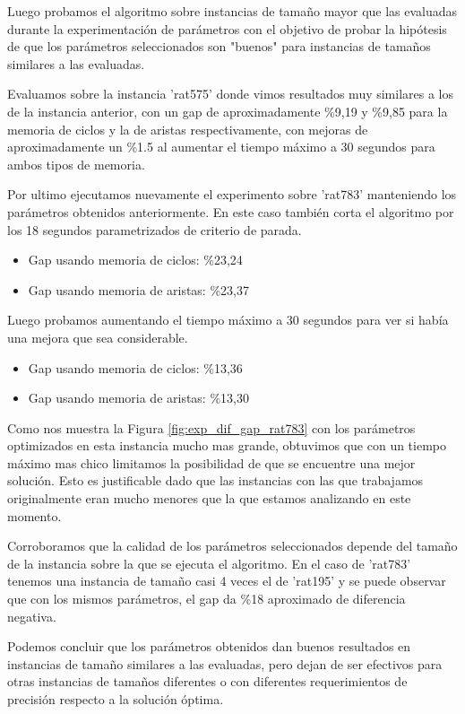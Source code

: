 \documentclass[10pt,a4paper]{article}
\begin{document}
Luego probamos el algoritmo sobre instancias de tamaño mayor que las evaluadas durante la experimentación de parámetros con el objetivo de probar la hipótesis de que los parámetros seleccionados son "buenos" para instancias de tamaños similares a las evaluadas.

Evaluamos sobre la instancia 'rat575' donde vimos resultados muy similares a los de la instancia anterior, con un gap de aproximadamente \%9,19 y \%9,85 para la memoria de ciclos y la de aristas respectivamente, con mejoras de aproximadamente un \%1.5 al aumentar el tiempo máximo a 30 segundos para ambos tipos de memoria.

Por ultimo ejecutamos nuevamente el experimento sobre 'rat783' manteniendo los parámetros obtenidos anteriormente. En este caso también corta el algoritmo por los 18 segundos parametrizados de criterio de parada.
\begin{itemize}
    \item Gap usando memoria de ciclos: \%23,24
    \item Gap usando memoria de aristas: \%23,37
\end{itemize}
Luego probamos aumentando el tiempo máximo a 30 segundos para ver si había una mejora que sea considerable.
\begin{itemize}
    \item Gap usando memoria de ciclos: \%13,36
    \item Gap usando memoria de aristas: \%13,30
\end{itemize}
Como nos muestra la Figura \ref{fig:exp_dif_gap_rat783} con los parámetros optimizados en esta instancia mucho mas grande, obtuvimos que con un tiempo máximo mas chico limitamos la posibilidad de que se encuentre una mejor solución. Esto es justificable dado que las instancias con las que trabajamos originalmente eran mucho menores que la que estamos analizando en este momento.

Corroboramos que la calidad de los parámetros seleccionados depende del tamaño de la instancia sobre la que se ejecuta el algoritmo. En el caso de 'rat783' tenemos una instancia de tamaño casi 4 veces el de 'rat195' y se puede observar que con los mismos parámetros, el gap da \%18 aproximado de diferencia negativa.

Podemos concluir que los parámetros obtenidos dan buenos resultados en instancias de tamaño similares a las evaluadas, pero dejan de ser efectivos para otras instancias de tamaños diferentes o con diferentes requerimientos de precisión respecto a la solución óptima.
\end{document}
